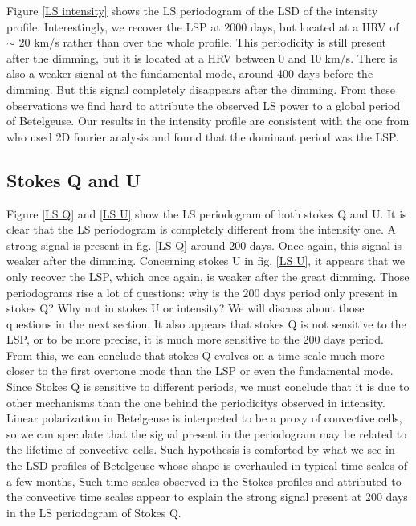 \documentclass{aa}
\begin{document}
Figure \ref{LS intensity} shows the LS periodogram of the LSD of the intensity profile. Interestingly, we recover the LSP at 2000 days, 
but located at a HRV of $\sim$ 20 km/s rather than over the whole profile. This periodicity is still present after the  dimming, but  it is located at a HRV between 0 and 10 km/s. 
There is also a weaker signal at the fundamental mode, around 400 days before the dimming. But this signal completely disappears after the dimming. From these observations
we find  hard to attribute 
the observed LS power to a global period of Betelgeuse.
Our results 
in the intensity profile are consistent with the one from \cite{mathias_evolution_2018} who used 2D fourier analysis and found that the dominant period was the LSP. 


\subsection{Stokes Q and U}

Figure \ref{LS Q} and \ref{LS U} show the LS periodogram of both stokes Q and U. It is clear that the LS periodogram is completely different 
from the intensity one. A strong signal is present in fig. \ref{LS Q} around 200 days. Once again, this signal is weaker after the dimming.
Concerning stokes U in fig. \ref{LS U}, it appears that we only recover the LSP, which once again, is weaker after the great dimming. 
Those periodograms rise a lot of questions: why is the 200 days period only present in stokes Q? Why not in stokes U or intensity? 
We will discuss about those questions in the next section. It also appears that stokes Q is not sensitive to the LSP, or to be more precise, 
it is much more sensitive to the 200 days period. From this, we can conclude that stokes Q evolves on a time scale much more closer to the first overtone 
mode than the LSP or even the fundamental mode. Since Stokes Q is sensitive  to different periods, we must conclude that it is due to other mechanisms
than the one behind the periodicitys observed in intensity. Linear polarization in Betelgeuse is interpreted to be a proxy of  convective cells,
so we can speculate that the signal present in the periodogram 
may be related to  the lifetime of convective cells. Such hypothesis is comforted by what we see in the 
LSD profiles of  Betelgeuse  whose shape is overhauled  in typical time scales of  a few months,  
Such time scales observed in the Stokes profiles and attributed to the convective time scales 
appear to explain the strong signal present at 200 days in the LS periodogram of Stokes Q. 
\end{document}
